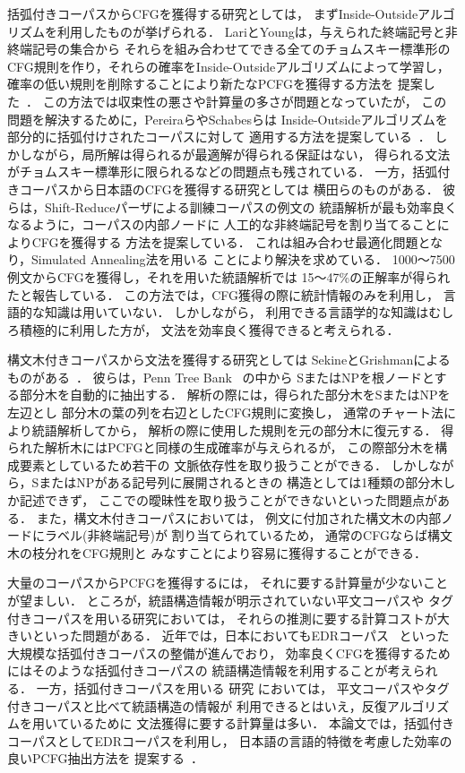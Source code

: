 括弧付きコーパスからCFGを獲得する研究としては，
まずInside-Outsideアルゴリズムを利用したものが挙げられる．
LariとYoungは，与えられた終端記号と非終端記号の集合から
それらを組み合わせてできる全てのチョムスキー標準形の
CFG規則を作り，それらの確率をInside-Outsideアルゴリズムによって学習し，
確率の低い規則を削除することにより新たなPCFGを獲得する方法を
提案した~\cite{lari90a}．
この方法では収束性の悪さや計算量の多さが問題となっていたが，
この問題を解決するために，PereiraらやSchabesらは
Inside-Outsideアルゴリズムを部分的に括弧付けされたコーパスに対して
適用する方法を提案している~\cite{pereira92a,schabes93b}．
しかしながら，局所解は得られるが最適解が得られる保証はない，
得られる文法がチョムスキー標準形に限られるなどの問題点も残されている．
一方，括弧付きコーパスから日本語のCFGを獲得する研究としては
横田らのものがある\cite{yokota96a}．
彼らは，Shift-Reduceパーザによる訓練コーパスの例文の
統語解析が最も効率良くなるように，コーパスの内部ノードに
人工的な非終端記号を割り当てることによりCFGを獲得する
方法を提案している．
これは組み合わせ最適化問題となり，Simulated Annealing法を用いる
ことにより解決を求めている．
1000〜7500例文からCFGを獲得し，それを用いた統語解析では
15〜47\%の正解率が得られたと報告している．
この方法では，CFG獲得の際に統計情報のみを利用し，
言語的な知識は用いていない．
しかしながら，
利用できる言語学的な知識はむしろ積極的に利用した方が，
文法を効率良く獲得できると考えられる．

構文木付きコーパスから文法を獲得する研究としては
SekineとGrishmanによるものがある~\cite{sekine95a}．
彼らは，Penn Tree Bank~\cite{marcus93a} の中から
SまたはNPを根ノードとする部分木を自動的に抽出する．
解析の際には，得られた部分木をSまたはNPを左辺とし
部分木の葉の列を右辺としたCFG規則に変換し，
通常のチャート法により統語解析してから，
解析の際に使用した規則を元の部分木に復元する．
得られた解析木にはPCFGと同様の生成確率が与えられるが，
この際部分木を構成要素としているため若干の
文脈依存性を取り扱うことができる．
しかしながら，SまたはNPがある記号列に展開されるときの
構造としては1種類の部分木しか記述できず，
ここでの曖昧性を取り扱うことができないといった問題点がある．
また，構文木付きコーパスにおいては，
例文に付加された構文木の内部ノードにラベル(非終端記号)が
割り当てられているため，
通常のCFGならば構文木の枝分れをCFG規則と
みなすことにより容易に獲得することができる．

大量のコーパスからPCFGを獲得するには，
それに要する計算量が少ないことが望ましい．
ところが，統語構造情報が明示されていない平文コーパスや
タグ付きコーパスを用いる研究においては，
それらの推測に要する計算コストが大きいといった問題がある．
近年では，日本においてもEDRコーパス~\cite{edr95a} といった
大規模な括弧付きコーパスの整備が進んでおり，
効率良くCFGを獲得するためにはそのような括弧付きコーパスの
統語構造情報を利用することが考えられる．
一方，括弧付きコーパスを用いる
研究\cite{pereira92a,schabes93b,yokota96a} においては，
平文コーパスやタグ付きコーパスと比べて統語構造の情報が
利用できるとはいえ，反復アルゴリズムを用いているために
文法獲得に要する計算量は多い．
本論文では，括弧付きコーパスとしてEDRコーパスを利用し，
日本語の言語的特徴を考慮した効率の良いPCFG抽出方法を
提案する~\cite{shirai95b,shirai95a}．

